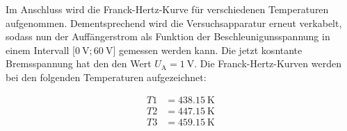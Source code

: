 \noindent Im Anschluss wird die Franck-Hertz-Kurve für verschiedenen Temperaturen aufgenommen. Dementsprechend wird die Versuchsapparatur erneut verkabelt, sodass 
nun der Auffängerstrom als Funktion der Beschleunigunsspannung in einem Intervall [$\qty{0}{\volt};\qty{60}{\volt}$] gemessen werden kann. Die jetzt kosntante 
Bremsspannung hat den den Wert $U_\text{A} = \qty{1}{\volt}$. Die Franck-Hertz-Kurven werden bei den folgenden Temperaturen aufgezeichnet:

\begin{align*}
    T1 &= \qty{438.15}{\kelvin} \\ 
    T2 &= \qty{447.15}{\kelvin} \\  
    T3 &= \qty{459.15}{\kelvin} \\  
\end{align*}





